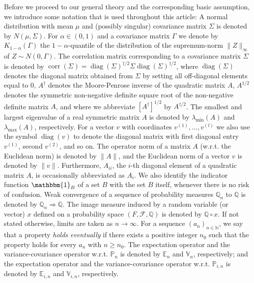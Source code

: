 \documentclass[preprint]{imsart}
\newcommand{\N}{{\mathbb N}}
\newcommand{\lmax}{\lambda_{\max}}
\newcommand{\lmin}{\lambda_{\min}}
\DeclareMathOperator{\diag}{diag}
\DeclareMathOperator{\corr}{corr}
\numberwithin{equation}{section}
\begin{document}
Before we proceed to our general theory and the corresponding basic assumption, we introduce some notation that is used throughout this article: A normal distribution with mean $\mu$ and (possibly singular) covariance matrix $\Sigma$ is denoted by $N(\mu, \Sigma)$. For $\alpha \in (0, 1)$ and a covariance matrix $\Gamma$ we denote by $K_{1-\alpha}(\Gamma)$ the $1-\alpha$-quantile of the distribution of the supremum-norm $\|Z\|_{\infty}$ of $Z \sim N(0, \Gamma)$. The correlation matrix corresponding to a covariance matrix $\Sigma$ is denoted by $\corr(\Sigma) = \diag(\Sigma)^{\dagger/2} \Sigma \diag(\Sigma)^{\dagger/2}$, where $\diag(\Sigma)$ denotes the diagonal matrix obtained from $\Sigma$ by setting all off-diagonal elements equal to $0$, $A^{\dagger}$ denotes the Moore-Penrose inverse of the quadratic matrix $A$, $A^{1/2}$ denotes the symmetric non-negative definite square root of the non-negative definite matrix $A$, and where we abbreviate $[A^{\dagger}]^{1/2}$ by $A^{\dagger/2}$. The smallest and largest eigenvalue of a real symmetric matrix $A$ is denoted by $\lmin(A)$ and $\lmax(A)$, respectively. For a vector $v$ with coordinates $v^{(1)}, \hdots, v^{(l)}$ we also use the symbol $\diag(v)$ to denote the diagonal matrix with first diagonal entry $v^{(1)}$, second $v^{(2)}$, and so on. The operator norm of a matrix $A$ (w.r.t. the Euclidean norm) is denoted by $\|A\|$, and the Euclidean norm of a vector $v$ is denoted by $\|v\|$. Furthermore, $A_{ii}$, the $i$-th diagonal element of a quadratic matrix $A$, is occasionally abbreviated as $A_i$. We also identify the indicator function $\mathbbm{1}_B$ of a set $B$ with the set $B$ itself, whenever there is no risk of confusion. Weak convergence of a sequence of probability measures $\mathbb{Q}_n$ to $\mathbb{Q}$ is denoted by $\mathbb{Q}_n \Rightarrow \mathbb{Q}$. The image measure induced by a random variable (or vector) $x$ defined on a probability space $(F, \mathcal{F}, \mathbb{Q})$ is denoted by $\mathbb{Q} \circ x$. If not stated otherwise, limits are taken as $n \to \infty$. For a sequence $(a_n)_{n\in\N}$, we say that a property \emph{holds eventually} if there exists a positive integer $n_0$ such that the property holds for every $a_n$ with $n\ge n_0$. The expectation operator and the variance-covariance operator w.r.t. $\mathbb{P}_n$ is denoted by $\mathbb{E}_n$ and $\mathbb{V}_n$, respectively; and the expectation operator and the variance-covariance operator w.r.t. $\mathbb{P}_{i,n}$ is denoted by $\mathbb{E}_{i,n}$ and $\mathbb{V}_{i,n}$, respectively.
\end{document}
